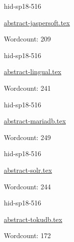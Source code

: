 

\begin{IU}

hid-sp18-516

\href{https://github.com/cloudmesh-community/hid-sp18-516/blob/master//technology/abstract-jaspersoft.tex}{abstract-jaspersoft.tex}

 

Wordcount: 209

\end{IU}



\begin{IU}

hid-sp18-516

\href{https://github.com/cloudmesh-community/hid-sp18-516/blob/master//technology/abstract-lingual.tex}{abstract-lingual.tex}

 

Wordcount: 241

\end{IU}



\begin{IU}

hid-sp18-516

\href{https://github.com/cloudmesh-community/hid-sp18-516/blob/master//technology/abstract-mariadb.tex}{abstract-mariadb.tex}

 

Wordcount: 249

\end{IU}



\begin{IU}

hid-sp18-516

\href{https://github.com/cloudmesh-community/hid-sp18-516/blob/master//technology/abstract-solr.tex}{abstract-solr.tex}

 

Wordcount: 244

\end{IU}



\begin{IU}

hid-sp18-516

\href{https://github.com/cloudmesh-community/hid-sp18-516/blob/master//technology/abstract-tokudb.tex}{abstract-tokudb.tex}

 

Wordcount: 172

\end{IU}

